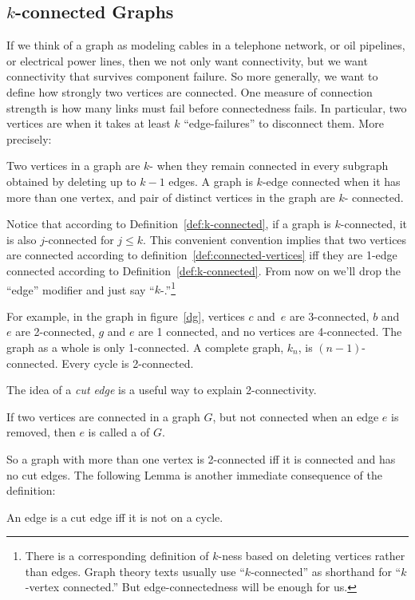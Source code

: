 \subsection{$k$-connected Graphs}

If we think of a graph as modeling cables in a telephone network, or
oil pipelines, or electrical power lines, then we not only want
connectivity, but we want connectivity that survives component
failure.  So more generally, we want to define how strongly two
vertices are connected.  One measure of connection strength is how
many links must fail before connectedness fails.  In particular, two
vertices are  when it takes at least $k$
``edge-failures'' to disconnect them.  More precisely:

\begin{definition}\label{def:k-connected}
Two vertices in a graph are $k$- when they remain
connected in every subgraph obtained by deleting up to $k-1$ edges.  A
graph is $k$-edge
connected when it has
more than one vertex, and pair of distinct vertices in the graph are
$k$- connected.
\end{definition}
\iffalse
every two of its vertices are $k$-edge connected.
\fi

Notice that according to Definition~\ref{def:k-connected}, if a graph
is $k$-connected, it is also $j$-connected for $j \le k$.  This
convenient convention implies that two vertices are connected
according to definition~\ref{def:connected-vertices} iff they are
1-edge connected according to Definition~\ref{def:k-connected}.  From
now on we'll drop the ``edge'' modifier and just say
``$k$-.''\footnote{There is a corresponding definition
  of $k$-ness based on
  deleting vertices rather than edges.  Graph theory texts usually use
  ``$k$-connected'' as shorthand for ``$k$-vertex connected.''  But
  edge-connectedness will be enough for us.}

For example, in the graph in figure~\ref{dg}, vertices $c$ and~$e$ are
3-connected, $b$ and~$e$ are 2-connected, $g$ and $e$ are 1 connected,
and no vertices are 4-connected.  The graph as a whole is only
1-connected.  A complete graph, $k_n$, is $(n-1)$-connected.  Every
cycle is 2-connected.

The idea of a \emph{cut edge} is a useful way to explain 2-connectivity.
\begin{definition}
If two vertices are connected in a graph $G$, but not connected when
an edge $e$ is removed, then $e$ is called a  of $G$.
\end{definition}
So a graph with more than one vertex is 2-connected iff it is
connected and has no cut edges.  The following Lemma is
another immediate consequence of the definition:
\begin{lemma}\label{lem:cutiffcycle}
An edge is a cut edge iff it is not on a cycle.
\end{lemma}

